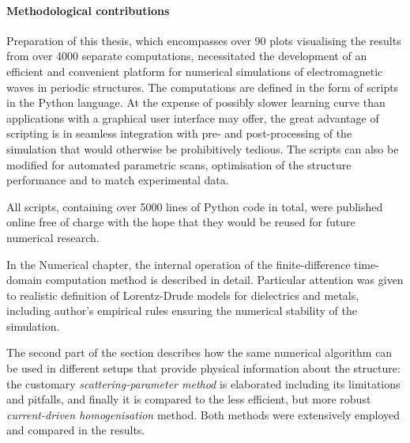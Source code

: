 \paragraph{Methodological contributions}
Preparation of this thesis, which encompasses over 90 plots visualising the results from over 4000 separate computations, necessitated the development of an efficient and convenient platform for numerical simulations of electromagnetic waves in periodic structures.
The computations are defined in the form of scripts in the Python language. At the expense of possibly slower learning curve than applications with a graphical user interface may offer, the great advantage of scripting is in seamless integration with pre- and post-processing of the simulation that would otherwise be prohibitively tedious. The scripts can also be modified for automated parametric scans, optimisation of the structure performance and to match experimental data.

All scripts, containing over 5000 lines of Python code in total, were published online free of charge \cite{dominec2014_meep_metamaterials} with the hope that they would be reused for future numerical research.

In the Numerical chapter, the internal operation of the finite-difference time-domain computation method is described in detail. Particular attention was given to realistic definition of Lorentz-Drude models for dielectrics and metals, including author's empirical rules ensuring the numerical stability of the simulation. 


The second part of the section describes how the same numerical algorithm can be used in different setups that provide physical information about the structure: the customary \textit{scattering-parameter method} is elaborated including its limitations and pitfalls, and finally it is compared to the less efficient, but more robust \textit{current-driven homogenisation} method. Both methods were extensively employed and compared in the results.

